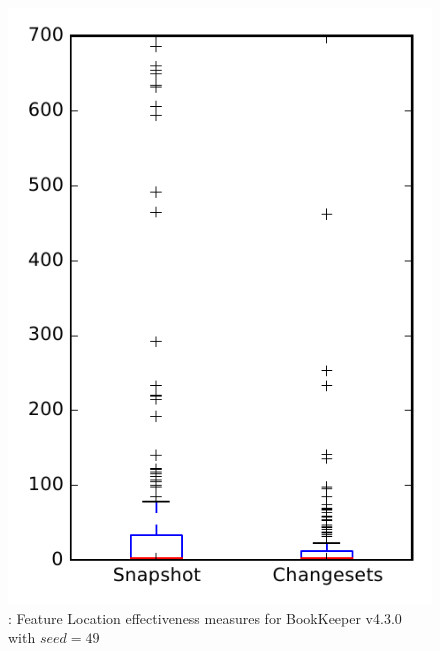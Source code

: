 
\begin{figure}
\centering
\includegraphics[height=0.4\textheight]{figures/flt_seed/rq1_bookkeeper_49}
\caption{\rone: Feature Location effectiveness measures for BookKeeper v4.3.0 with $seed=49$}
\label{fig:flt_seed:rq1:bookkeeper}
\end{figure}
